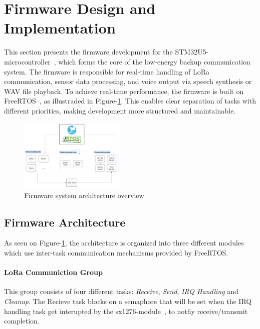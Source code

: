 \section{Firmware Design and Implementation}

This section presents the firmware development for the STM32U5-microcontroller~\cite{stm32u5}, which forms the core of the low-energy backup communication system.
The firmware is responsible for real-time handling of LoRa communication, sensor data processing, and voice output via speech synthesis or WAV file playback. 
To achieve real-time performance, the firmware is built on FreeRTOS~\cite{freertos}, as illustraded in Figure-\ref{fig:firmware-system}. This enables clear separation of tasks with different priorities, making development more structured and maintainable.

\begin{figure}[H]
\centering
\includegraphics[width=0.45\textwidth]{images/firmware-system-design.png}
\caption{Firmware system architecture overview}\label{fig:firmware-system}
\end{figure}

\subsection{Firmware Architecture}

As seen on Figure-\ref{fig:firmware-system}, the architecture is organized into three different modules which use inter-task communication mechanisms provided by FreeRTOS. 

\paragraph{LoRa Communiction Group}

This group consists of four different tasks: \textit{Receive}, \textit{Send}, \textit{IRQ Handling} and \textit{Cleanup}. The Recieve task blocks on a semaphore that will be set when the IRQ handling task get interupted by the sx1276-module~\cite{sx1276}, to notfiy receive/transmit completion.


